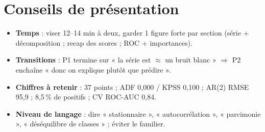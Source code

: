 \documentclass[11pt,a4paper]{article}
\begin{document}
\section{Conseils de présentation}
\begin{itemize}[nosep]
  \item \textbf{Temps} : viser 12--14 min à deux, garder 1 figure forte par section (série + décomposition ; recap des scores ; ROC + importances).
  \item \textbf{Transitions} : P1 termine sur « la série est $\approx$ un bruit blanc » $\Rightarrow$ P2 enchaîne « donc on explique plutôt que prédire ».
  \item \textbf{Chiffres à retenir} : 37 points ; ADF 0{,}000 / KPSS 0{,}100 ; AR(2) RMSE 95{,}9 ; 8{,}5\,\% de positifs ; CV ROC-AUC 0{,}84.
  \item \textbf{Niveau de langage} : dire « stationnaire », « autocorrélation », « parcimonie », « déséquilibre de classes » ; éviter le familier.
\end{itemize}
\end{document}
